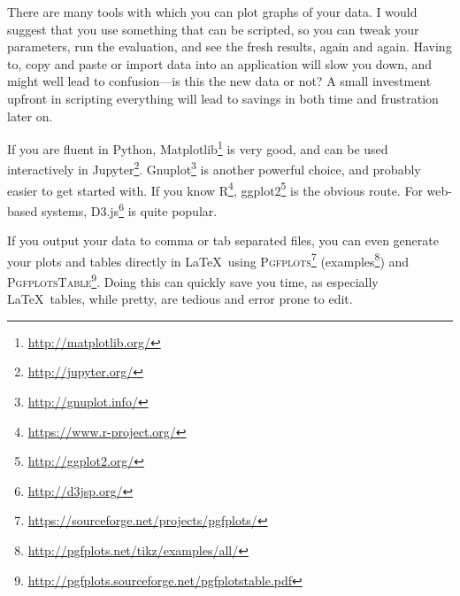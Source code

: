 There are many tools with which you can plot graphs of your data. I would
suggest that you use something that can be scripted, so you can tweak your
parameters, run the evaluation, and see the fresh results, again and
again. Having to, \eg copy and paste or import data into an application will
slow you down, and might well lead to confusion---is this the new data or
not? A small investment upfront in scripting everything will lead to
savings in both time and frustration later on.

If you are fluent in Python,
Matplotlib\footnote{\url{http://matplotlib.org/}} is very good, and can be
used interactively in
Jupyter\footnote{\url{http://jupyter.org/}}. Gnuplot\footnote{\url{http://gnuplot.info/}}
is another powerful choice, and probably easier to get started with. If you
know R\footnote{\url{https://www.r-project.org/}},
ggplot2\footnote{\url{http://ggplot2.org/}} is the obvious route.  For
web-based systems, D3.js\footnote{\url{http://d3jsp.org/}} is quite popular.

If you output your data to comma or tab separated files, you can even
generate your plots and tables directly in \LaTeX\ using
\textsc{Pgfplots}\footnote{\url{https://sourceforge.net/projects/pgfplots/}}
   (examples\footnote{\url{http://pgfplots.net/tikz/examples/all/}}) and
\textsc{PgfplotsTable}\footnote{\url{http://pgfplots.sourceforge.net/pgfplotstable.pdf}}.
Doing this can quickly save you time, as especially \LaTeX\ tables, while
pretty, are tedious and error prone to edit. 




